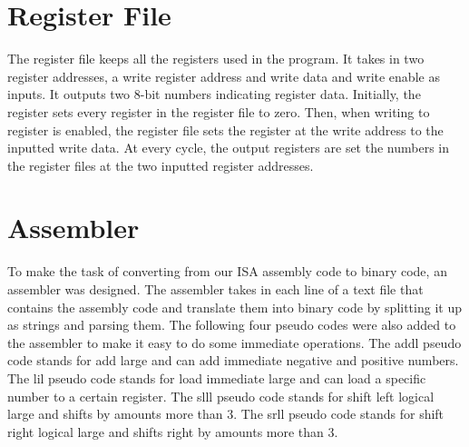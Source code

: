\documentclass[journal]{IEEEtran}
\begin{document}
\section{Register File}
The register file keeps all the registers used in the program. It takes in two register addresses, a write register address and write data and  write enable as inputs. It outputs two 8-bit numbers indicating register data. Initially, the register sets every register in the register file to zero. Then, when writing to register is enabled, the register file sets the register at the write address to the inputted write data. At every cycle, the output registers are set the numbers in the register files at the two inputted register addresses.

\appendices

\section*{Assembler}
To make the task of converting from our ISA assembly code to binary code, an assembler was designed. The assembler takes in each line of a text file that contains the assembly code and translate them into binary code by splitting it up as strings and parsing them. The following four pseudo codes were also added to the assembler to make it easy to do some immediate operations. The addl pseudo code stands for add large and can add immediate negative and positive numbers. The lil pseudo code stands for load immediate large and can load a specific number to a certain register. The slll pseudo code stands for shift left logical large and shifts by amounts more than 3. The srll pseudo code stands for shift right logical large and shifts right by amounts more than 3.  
\end{document}
